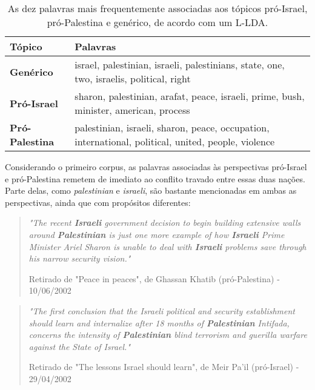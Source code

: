 \begin{table}[h]
\label{tab1}
\centering
\begin{tabular}{| l | p{10cm} | }
\hline
\textbf{Tópico} & \textbf{Palavras} \\ \hline
\textbf{Genérico} & israel, palestinian, israeli, palestinians, state, one, two, israelis, political, right \\ \hline
\textbf{Pró-Israel} & sharon, palestinian, arafat, peace, israeli, prime, bush, minister, american, process \\ \hline
\textbf{Pró-Palestina} & palestinian, israeli, sharon, peace, occupation, international, political, united, people, violence \\ \hline
\end{tabular}
\caption{As dez palavras mais frequentemente associadas aos tópicos pró-Israel, pró-Palestina e genérico, de acordo com um L-LDA.}
\end{table}


Considerando o primeiro corpus, as palavras associadas às perspectivas pró-Israel e pró-Palestina remetem de imediato ao conflito travado entre essas duas nações. Parte delas, como \emph{palestinian} e \emph{israeli}, são bastante mencionadas em ambas as perspectivas, ainda que com propósitos diferentes: %

\begin{quote}

\emph{"The recent \textbf{Israeli} government decision to begin building extensive walls
around \textbf{Palestinian} is just one more example of how \textbf{Israeli} Prime
Minister Ariel Sharon is unable to deal with \textbf{Israeli} problems save
through his narrow security vision."}

{\small Retirado de "Peace in peaces", de Ghassan Khatib (pró-Palestina) - 10/06/2002}
\end{quote}

\begin{quote}

\emph{"The first conclusion that the Israeli political and security
establishment should learn and internalize after 18 months of
\textbf{Palestinian} Intifada, concerns the intensity of \textbf{Palestinian} blind
terrorism and guerilla warfare against the State of Israel."}

{\small Retirado de "The lessons Israel should learn", de Meir Pa'il (pró-Israel) - 29/04/2002}
\end{quote}



